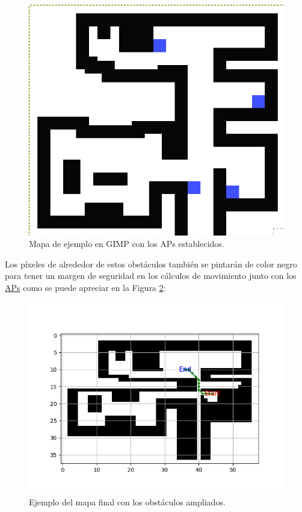 \begin{figure}[H]
  \centering
  \includegraphics[scale=0.3]{figs/mapa_apes} %
  \caption{ Mapa de ejemplo en GIMP con los APs establecidos.}
  \label{fig:mapa_apes}
\end{figure}

Los píxeles de alrededor de estos obstáculos también se pintarán de color negro para tener un margen de seguridad en los cálculos de movimiento junto con los \hyperlink{APs}{APs} como se puede apreciar en la Figura \ref{fig:astar7}:


\begin{figure}[H]
  \centering
  \includegraphics[scale=0.8]{figs/astar} %
  \caption{ Ejemplo del mapa final con los obstáculos ampliados.}
  \label{fig:astar7}
\end{figure}

